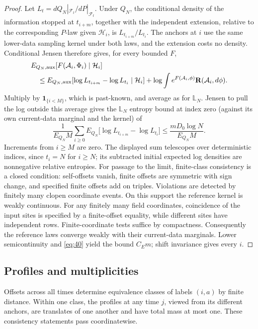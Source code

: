 \begin{proof}
Let \(L_t=dQ_N|_{\mathcal F_t}/dP|_{\mathcal F_t}\). Under \(Q_N\),
the conditional density of the information stopped at \(t_{i+m}\),
together with the independent extension, relative to the corresponding
\(P\)-law given \(\mathcal H_i\), is \(L_{t_{i+m}}/L_{t_i}\).
The anchors at \(i\) use the same lower-data sampling kernel under both
laws, and the extension costs no density. Conditional Jensen therefore
gives, for every bounded \(F\),
\[
\begin{aligned}
&E_{Q_N,{\rm aux}}[F(\mathcal A_i,\Phi_i)\mid\mathcal H_i]\\
&\quad\le
E_{Q_N,{\rm aux}}[\log L_{t_{i+m}}-\log L_{t_i}\mid\mathcal H_i]
+\log\int e^{F(\mathcal A_i,\phi)}\mathbf R(\mathcal A_i,d\phi).
\end{aligned}
\]
Multiply by \(\mathbf1_{\{i<M\}}\), which is past-known, and average as for \(\mathbb L_N\). Jensen to pull the log outside this average gives the \(\mathbb L_N\) entropy bound at index zero (against its own current-data marginal and the kernel) of
\[
\frac{1}{E_{Q_N}M}\sum_{i\ge0}E_{Q_N}\big[\log L_{t_{i+m}}-\log L_{t_i}\big]
\le \frac{mD_0\log N}{E_{Q_N}M}.
\]
Increments from \(i\ge M\) are zero. The displayed sum telescopes
over deterministic indices, since \(t_i=N\) for \(i\ge N\); its
subtracted initial expected log densities are nonnegative relative
entropies. For passage to the limit, finite-class consistency is a
closed condition: self-offsets vanish, finite offsets are symmetric
with sign change, and specified finite offsets add on triples.
Violations are detected by finitely many clopen coordinate events.
On this support the reference kernel is weakly continuous. For any
finitely many field coordinates, coincidence of the input sites is
specified by a finite-offset equality, while different sites have
independent rows. Finite-coordinate tests suffice by compactness.
Consequently the reference laws converge weakly with their current-data
marginals. Lower semicontinuity and \eqref{eq:40} yield the bound
\(C_E m\); shift invariance gives every \(i\).
\end{proof}

\subsection{Profiles and multiplicities}

Offsets across all times determine equivalence classes of labels
\((i,a)\) by finite distance. Within one class, the profiles at any
time \(j\), viewed from its different anchors, are translates of one
another and have total mass at most one. These consistency statements
pass coordinatewise.

